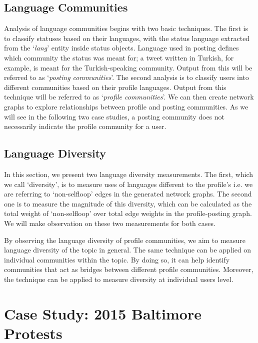 \subsection{Language Communities}\label{langcomm}

Analysis of language communities begins with two basic techniques. The
first is to classify statuses based on their languages, with the
status language extracted from the `{\emph{lang}}' entity inside
status objects. Language used in posting defines which community the
status was meant for; a tweet written in Turkish, for example, is
meant for the Turkish-speaking community. Output from this will be
referred to as `{\emph{posting communities}}'. The second analysis is
to classify users into different communities based on their profile
languages. Output from this technique will be referred to as
`{\emph{profile communities}}'. We can then create network graphs to
explore relationships between profile and posting communities.  As we
will see in the following two case studies, a posting community does
not necessarily indicate the profile community for a user.

\subsection{Language Diversity}\label{diversity}

In this section, we present two language diversity measurements. The
first, which we call `diversity', is to measure uses of languages
different to the profile's i.e. we are referring to `non-selfloop'
edges in the generated network graphs. The second one is to measure
the magnitude of this diversity, which can be calculated as the total
weight of `non-selfloop' over total edge weights in the
profile-posting graph. We will make observation on these two
measurements for both cases.

By observing the language diversity of profile communities, we aim to
measure language diversity of the topic in general. The same technique
can be applied on individual communities within the topic. By doing
so, it can help identify communities that act as bridges between
different profile communities. Moreover, the technique can be applied
to measure diversity at individual users level.


\section{Case Study: 2015 Baltimore Protests}\label{baltimorecasestudy}

